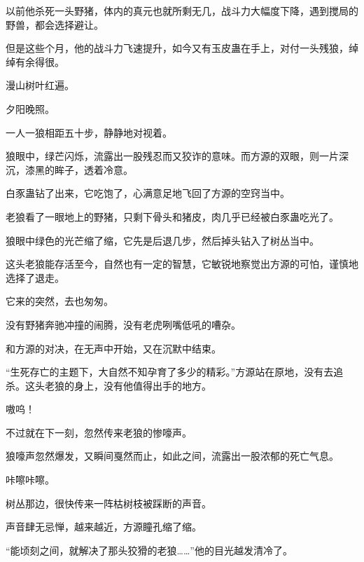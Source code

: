 \begin{this_body}
以前他杀死一头野猪，体内的真元也就所剩无几，战斗力大幅度下降，遇到搅局的野兽，都会选择避让。

但是这些个月，他的战斗力飞速提升，如今又有玉皮蛊在手上，对付一头残狼，绰绰有余得很。

漫山树叶红遍。

夕阳晚照。

一人一狼相距五十步，静静地对视着。

狼眼中，绿芒闪烁，流露出一股残忍而又狡诈的意味。而方源的双眼，则一片深沉，漆黑的眸子，透着冷意。

白豕蛊钻了出来，它吃饱了，心满意足地飞回了方源的空窍当中。

老狼看了一眼地上的野猪，只剩下骨头和猪皮，肉几乎已经被白豕蛊吃光了。

狼眼中绿色的光芒缩了缩，它先是后退几步，然后掉头钻入了树丛当中。

这头老狼能存活至今，自然也有一定的智慧，它敏锐地察觉出方源的可怕，谨慎地选择了退走。

它来的突然，去也匆匆。

没有野猪奔驰冲撞的闹腾，没有老虎咧嘴低吼的嘈杂。

和方源的对决，在无声中开始，又在沉默中结束。

“生死存亡的主题下，大自然不知孕育了多少的精彩。”方源站在原地，没有去追杀。这头老狼的身上，没有他值得出手的地方。

嗷呜！

不过就在下一刻，忽然传来老狼的惨嚎声。

狼嚎声忽然爆发，又瞬间戛然而止，如此之间，流露出一股浓郁的死亡气息。

咔嚓咔嚓。

树丛那边，很快传来一阵枯树枝被踩断的声音。

声音肆无忌惮，越来越近，方源瞳孔缩了缩。

“能顷刻之间，就解决了那头狡猾的老狼……”他的目光越发清冷了。

\end{this_body}

